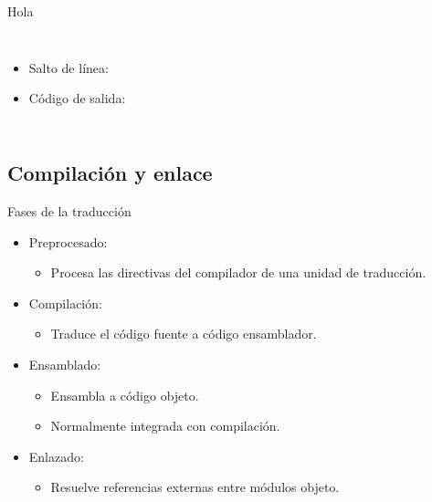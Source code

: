 \begin{frame}{Hola}
\begin{columns}
\begin{itemize}
{\begin{itemize}
          \item Operador para enviar datos a la salida estándar.
          \item Definido para la mayoría de los tipos.
        \end{itemize}
      }
    \item Salto de línea: 
    \item Código de salida: 
  \end{itemize}

\end{columns}
\end{frame}

\subsection{Compilación y enlace}

\begin{frame}[t]{Fases de la traducción}
\begin{itemize}
  \item Preprocesado:
    \begin{itemize}
      \item Procesa las directivas del compilador de una unidad de traducción.
    \end{itemize}
  \vfill
  \item Compilación:
    \begin{itemize}
      \item Traduce el código fuente a código ensamblador.
    \end{itemize}
  \vfill
  \item Ensamblado:
    \begin{itemize}
      \item Ensambla a código objeto.
      \item Normalmente integrada con compilación.
    \end{itemize}
  \vfill
  \item Enlazado:
    \begin{itemize}
      \item Resuelve referencias externas entre módulos objeto.
    \end{itemize}
\end{itemize}
\end{frame}

